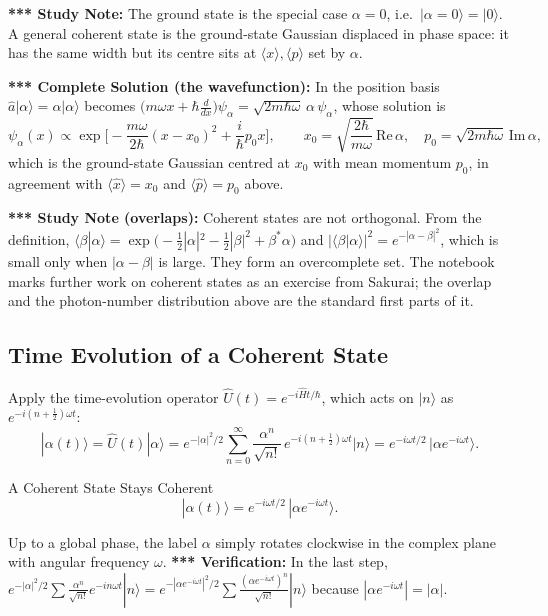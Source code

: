 \documentclass[11pt,a4paper]{article}
\begin{document}
\textbf{*** Study Note:} The ground state is the special case $\alpha=0$, i.e.\ $|\alpha=0\rangle=|0\rangle$. A general coherent state is the ground-state Gaussian displaced in phase space: it has the same width but its centre sits at $\langle x\rangle,\langle p\rangle$ set by $\alpha$.

\textbf{*** Complete Solution (the wavefunction):} In the position basis $\hat a|\alpha\rangle=\alpha|\alpha\rangle$ becomes $\big(m\omega x+\hbar\frac d{dx}\big)\psi_\alpha=\sqrt{2m\hbar\omega}\,\alpha\,\psi_\alpha$, whose solution is
\[
\psi_\alpha(x)\propto\exp\Big[-\frac{m\omega}{2\hbar}(x-x_0)^2+\frac i\hbar p_0x\Big],\qquad
x_0=\sqrt{\frac{2\hbar}{m\omega}}\,\mathrm{Re}\,\alpha,\quad p_0=\sqrt{2m\hbar\omega}\,\mathrm{Im}\,\alpha ,
\]
which is the ground-state Gaussian centred at $x_0$ with mean momentum $p_0$, in agreement with $\langle\hat x\rangle=x_0$ and $\langle\hat p\rangle=p_0$ above.

\textbf{*** Study Note (overlaps):} Coherent states are not orthogonal. From the definition, $\langle\beta|\alpha\rangle=\exp\big(-\tfrac12|\alpha|^2-\tfrac12|\beta|^2+\beta^*\alpha\big)$ and $|\langle\beta|\alpha\rangle|^2=e^{-|\alpha-\beta|^2}$, which is small only when $|\alpha-\beta|$ is large. They form an overcomplete set. The notebook marks further work on coherent states as an exercise from Sakurai; the overlap and the photon-number distribution above are the standard first parts of it.

\subsection{Time Evolution of a Coherent State}
Apply the time-evolution operator $\hat U(t)=e^{-i\hat Ht/\hbar}$, which acts on $|n\rangle$ as $e^{-i(n+\frac12)\omega t}$:
\[
|\alpha(t)\rangle=\hat U(t)|\alpha\rangle=e^{-|\alpha|^2/2}\sum_{n=0}^\infty\frac{\alpha^n}{\sqrt{n!}}\,e^{-i(n+\frac12)\omega t}|n\rangle
=e^{-i\omega t/2}\,\big|\alpha e^{-i\omega t}\big\rangle .
\]
\begin{thm}{A Coherent State Stays Coherent}
\[
|\alpha(t)\rangle=e^{-i\omega t/2}\,|\alpha e^{-i\omega t}\rangle .
\]
\end{thm}
Up to a global phase, the label $\alpha$ simply rotates clockwise in the complex plane with angular frequency $\omega$.
\textbf{*** Verification:} In the last step, $e^{-|\alpha|^2/2}\sum\frac{\alpha^n}{\sqrt{n!}}e^{-in\omega t}|n\rangle=e^{-|\alpha e^{-i\omega t}|^2/2}\sum\frac{(\alpha e^{-i\omega t})^n}{\sqrt{n!}}|n\rangle$ because $|\alpha e^{-i\omega t}|=|\alpha|$.
\end{document}
